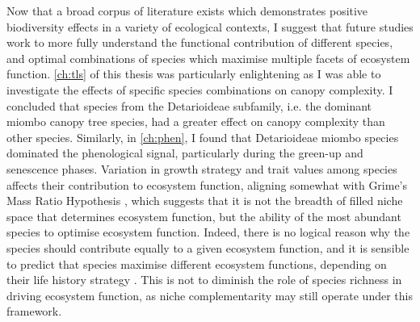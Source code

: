 \begin{refsection}
Now that a broad corpus of literature exists which demonstrates positive biodiversity effects in a variety of ecological contexts, I suggest that future studies work to more fully understand the functional contribution of different species, and optimal combinations of species which maximise multiple facets of ecosystem function. \autoref{ch:tls} of this thesis was particularly enlightening as I was able to investigate the effects of specific species combinations on canopy complexity. I concluded that species from the Detarioideae subfamily, i.e. the dominant miombo canopy tree species, had a greater effect on canopy complexity than other species. Similarly, in \autoref{ch:phen}, I found that Detarioideae miombo species dominated the phenological signal, particularly during the green-up and senescence phases. Variation in growth strategy and trait values among species affects their contribution to ecosystem function, aligning somewhat with Grime's Mass Ratio Hypothesis \citep{Grime1998}, which suggests that it is not the breadth of filled niche space that determines ecosystem function, but the ability of the most abundant species to optimise ecosystem function. Indeed, there is no logical reason why the species should contribute equally to a given ecosystem function, and it is sensible to predict that species maximise different ecosystem functions, depending on their life history strategy \citep{Bengtsson1998}. This is not to diminish the role of species richness in driving ecosystem function, as niche complementarity may still operate under this framework.



\end{refsection}
